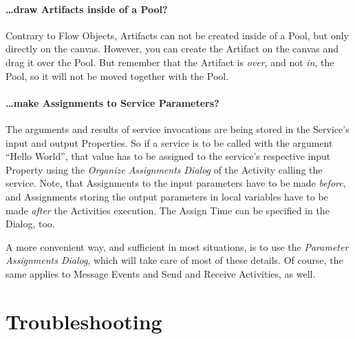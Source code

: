 \paragraph*{\dots draw Artifacts inside of a Pool?}
Contrary to Flow Objects, Artifacts can not be created inside of a Pool, but only
directly on the canvas.  However, you can create the Artifact on the canvas and
drag it over the Pool.  But remember that the Artifact is \emph{over}, and not
\emph{in}, the Pool, so it will not be moved together with the Pool.


\paragraph*{\dots make Assignments to Service Parameters?}
The arguments and results of service invocations are being stored in the Service's
input and output Properties.  So if a service is to be called with the argument
``Hello World'', that value has to be assigned to the service's respective input
Property using the \emph{Organize Assignments Dialog} of the Activity calling the
service.  Note, that Assignments to the input parameters have to be made
\emph{before}, and Assignments storing the output parameters in local variables
have to be made \emph{after} the Activities execution.  The Assign Time can be
specified in the Dialog, too.


A more convenient way, and sufficient in most situations, is to use the
\emph{Parameter Assignments Dialog}, which will take care of most of these details.
Of course, the same applies to Message Events and Send and Receive Activities, as
well.




\section{Troubleshooting}

